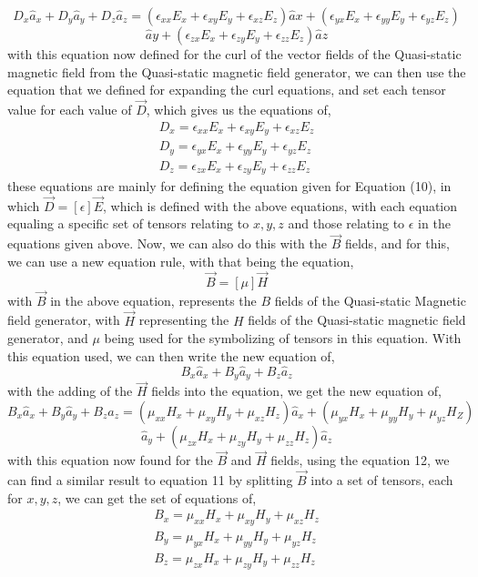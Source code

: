 \documentclass[]{article}
\begin{document}
\[D_x \hat{a}_x + D_y \hat{a}_y + D_z \hat{a}_z = (\epsilon_{xx} E_x + \epsilon_{xy}E_y + \epsilon_{xz}E_z)\hat{a}x+(\epsilon_{yx}E_x + \epsilon_{yy}E_y + \epsilon_{yz}E_z) \]
\[\hat{a}y + (\epsilon_{zx}E_x + \epsilon_{zy}E_y + \epsilon_{zz}E_z)\hat{a}z\]
\linebreak
with this equation now defined for the curl of the vector fields of the Quasi-static magnetic field from the Quasi-static magnetic field generator, we can then use the equation that we defined for expanding the curl equations, and set each tensor value for each value of $\vec{D}$, which gives us the equations of,
\begin{equation}
\begin{array}{c}
D_x = \epsilon_{xx} E_x + \epsilon_{xy}E_y + \epsilon_{xz}E_z\\
D_y = \epsilon_{yx} E_x + \epsilon_{yy}E_y + \epsilon_{yz}E_z \\
D_z = \epsilon_{zx} E_x + \epsilon_{zy}E_y + \epsilon_{zz}E_z
\end{array}
\end{equation}
these equations are mainly for defining the equation given for Equation (10), in which $\vec{D} = [\epsilon] \vec{E}$, which is defined with the above equations, with each equation equaling a specific set of tensors relating to $x, y, z$ and those relating to $\epsilon$ in the equations given above. Now, we can also do this with the $\vec{B}$ fields, and for this, we can use a new equation rule, with that being the equation,
\begin{equation}
\vec{B} = [\mu]\vec{H}
\end{equation}
with $\vec{B}$ in the above equation, represents the $B$ fields of the Quasi-static Magnetic field generator, with $\vec{H}$ representing the $H$ fields of the Quasi-static magnetic field generator, and $\mu$ being used for the symbolizing of tensors in this equation. With this equation used, we can then write the new equation of,
\[B_x\hat{a}_x + B_y\hat{a}_y+B_z\hat{a}_z\]
with the adding of the $\vec{H}$ fields into the equation, we get the new equation of,
\[B_x\hat{a}_x + B_y\hat{a}_y+B_z\hat{a}_z = (\mu_{xx}H_x+\mu_{xy}H_y + \mu_{xz}H_z)\hat{a}_x + (\mu_{yx}H_x + \mu_{yy}H_y + \mu_{yz}H_Z)\]
\[\hat{a}_y + (\mu_{zx}H_x + \mu_{zy}H_y+ \mu_{zz}H_z)\hat{a}_z\]
with this equation now found for the $\vec{B}$ and $\vec{H}$ fields, using the equation 12, we can find a similar result to equation 11 by splitting $\vec{B}$ into a set of tensors, each for $x,y,z$, we can get the set of equations of,
\begin{equation}
\begin{array}{c}
B_x = \mu_{xx}H_x + \mu_{xy}H_y + \mu_{xz}H_z \\
B_y = \mu_{yx}H_x + \mu_{yy}H_y + \mu_{yz}H_z \\
B_z = \mu_{zx}H_x + \mu_{zy}H_y + \mu_{zz}H_z
\end{array}
\end{equation}
\end{document}
